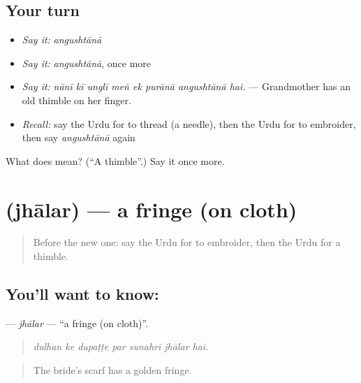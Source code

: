 \subsection*{Your turn}
\begin{itemize}
\raggedright
  \item \emph{Say it:} \emph{angushtānā}
  \item \emph{Say it:} \emph{angushtānā}, once more
  \item \emph{Say it:} \emph{nānī kī unglī meṅ ek purānā angushtānā hai.} — Grandmother has an old thimble on her finger.
  \item \emph{Recall:} say the Urdu for to thread (a needle), then the Urdu for to embroider, then say \emph{angushtānā} again
\end{itemize}

\begin{tcolorbox}[breakable,colback=teal!4,colframe=teal!35!black,title={Before you move on}]
What does  mean? (\textquotedblleft{}A thimble\textquotedblright{}.) Say it once more.
\end{tcolorbox}
\section[\texorpdfstring{\ur{جھالر} (jhālar)}{جھالر (jhālar)}]{ (jhālar) — a fringe (on cloth)}

\label{lesson:UR-C514-jhalar}



\begin{quote}
Before the new one: say the Urdu for to embroider, then the Urdu for a thimble.
\end{quote}

\subsection*{You'll want to know: }
\textbf{} — \emph{jhālar} — \textquotedblleft{}a fringe (on cloth)\textquotedblright{}.

\begin{quote}
      
\end{quote}

\begin{quote}
\emph{dulhan ke dupaṭṭe par sunahrī jhālar hai.}
\end{quote}

\begin{quote}
The bride's scarf has a golden fringe.
\end{quote}

